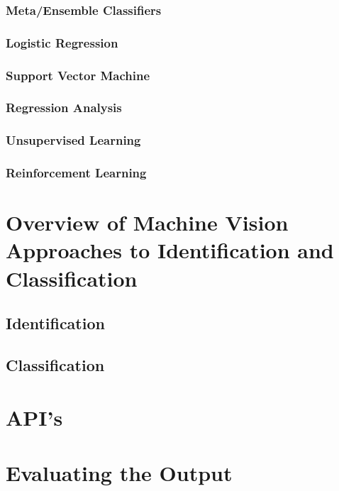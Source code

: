 \subsubsection{Meta/Ensemble Classifiers}
\subsubsection{Logistic Regression}
\subsubsection{Support Vector Machine}
\subsubsection{Regression Analysis}
\subsubsection{Unsupervised Learning}
\subsubsection{Reinforcement Learning}

\section{Overview of Machine Vision Approaches to Identification and Classification}
\subsection{Identification}
\subsection{Classification}

\section{API's}

\section{Evaluating the Output}

